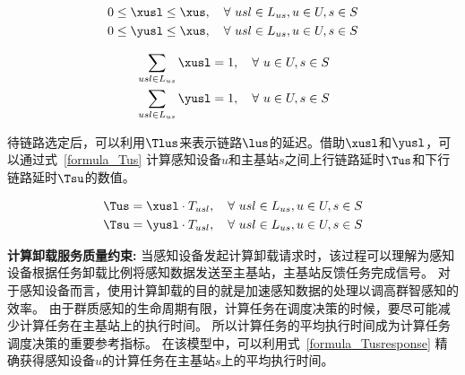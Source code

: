 \begin{equation}
\label{formula_xusl}
\begin{aligned}
0 \leq \xusl \leq \xus, \quad \forall \ usl\in L_{us}, u\in U, s\in S\\
0 \leq \yusl \leq \xus, \quad \forall \ usl\in L_{us}, u\in U, s\in S\\
\end{aligned}
\end{equation}

\begin{equation}
\label{formula_xusl1}
\begin{aligned}
&\sum_{usl\in L_{us}}\xusl = 1, \quad \forall \ u\in U, s\in S\\
&\sum_{usl\in L_{us}}\yusl = 1, \quad \forall \ u\in U, s\in S\\
\end{aligned}
\end{equation}

待链路选定后，可以利用$\Tlus$来表示链路$\lus$的延迟。借助$\xusl$和$\yusl$，可以通过式~\eqref{formula_Tus} 计算感知设备$u$和主基站$s$之间上行链路延时$\Tus$和下行链路延时$\Tsu$的数值。

\begin{equation}
\label{formula_Tus}
\begin{aligned}
&\Tus = \xusl \cdot T_{usl}, \quad \forall \ usl\in L_{us}, u\in U, s\in S\\
&\Tsu = \yusl \cdot T_{usl}, \quad \forall \ usl\in L_{us}, u\in U, s\in S\\
\end{aligned}
\end{equation}

\textbf{计算卸载服务质量约束:}
当感知设备发起计算卸载请求时，该过程可以理解为感知设备根据任务卸载比例将感知数据发送至主基站，主基站反馈任务完成信号。
对于感知设备而言，使用计算卸载的目的就是加速感知数据的处理以调高群智感知的效率。
由于群质感知的生命周期有限，计算任务在调度决策的时候，要尽可能减少计算任务在主基站上的执行时间。
所以计算任务的平均执行时间成为计算任务调度决策的重要参考指标。
在该模型中，可以利用式~\ref{formula_Tusresponse} 精确获得感知设备$u$的计算任务在主基站$s$上的平均执行时间。


